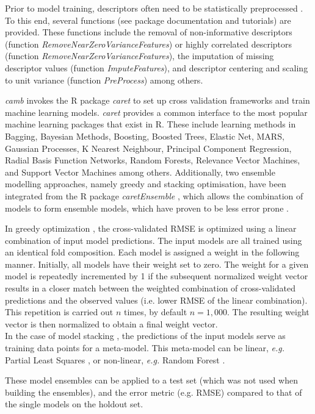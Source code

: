 \documentclass[twoside,a4wide,10pt]{article}
\begin{document}
Prior to model training, descriptors often need to be statistically preprocessed \citep{andersson}.
To this end, several functions (see package documentation and tutorials)
are provided.
These functions include the removal of non-informative descriptors (function {\it RemoveNearZeroVarianceFeatures})
or highly correlated descriptors (function {\it RemoveNearZeroVarianceFeatures}),
the imputation of missing descriptor values (function {\it ImputeFeatures}),
and descriptor centering and scaling to unit variance (function {\it PreProcess}) among others.

{\it camb} invokes the R package {\it caret} to set up cross validation frameworks and
train machine learning models. {\it caret} provides a common interface to the most popular machine learning packages that exist in R.
These include learning methods in Bagging, Bayesian Methods, Boosting, Boosted Trees, Elastic Net, MARS, Gaussian Processes, K Nearest Neighbour, Principal Component Regression, Radial Basis Function Networks, Random Forests, Relevance Vector Machines, and Support Vector Machines among others.
Additionally, two ensemble modelling approaches, namely greedy and stacking optimisation,
have been integrated from the R package {\it caretEnsemble} \citep{caretEnsemble},
which allows the combination of models to form ensemble models, which have proven to be less error prone \citep{cortesCOX}.

In greedy optimization \citep{caruana}, the cross-validated RMSE is optimized using a linear combination of input model predictions. 
The input models are all trained using an identical fold composition.
Each model is assigned a weight in the following manner. 
Initially, all models have their weight set to zero. 
The weight for a given model is repeatedly incremented by 1 if the subsequent normalized weight vector results in a
closer match between the weighted combination of cross-validated predictions and the observed values (i.e. lower RMSE of the linear combination). 
This repetition is carried out $n$ times, by default $n = 1,000$.
The resulting weight vector is then normalized to obtain a final weight vector.\\

In the case of model stacking \citep{cortesCOX}, 
the predictions of the input models serve as training data points for a meta-model.
This meta-model can be linear, {\it e.g.} Partial Least Squares \citep{pls},
or non-linear, {\it e.g.} Random Forest \citep{rf}.

These model ensembles can be applied to a test set (which was not used when building the ensembles), and the error metric (e.g. RMSE) compared to that of the single models on the holdout set.\\
\end{document}
